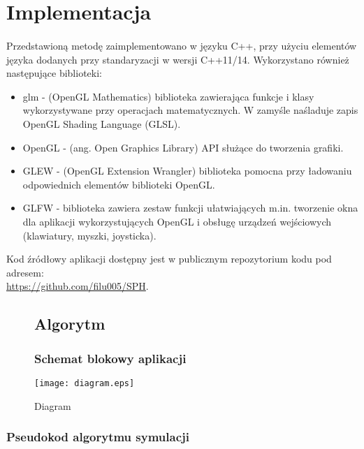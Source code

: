\newpage

\section{Implementacja}

\paragraph{}
Przedstawioną metodę zaimplementowano w języku C++, przy użyciu elementów języka dodanych przy standaryzacji w wersji C++11/14. Wykorzystano również następujące biblioteki:
\begin{itemize}
	\item glm - (OpenGL Mathematics) biblioteka zawierająca funkcje i klasy wykorzystywane przy operacjach matematycznych. W zamyśle naśladuje zapis OpenGL Shading Language (GLSL).
	\item OpenGL - (ang. Open Graphics Library) API służące do tworzenia grafiki.
	\item GLEW - (OpenGL Extension Wrangler) biblioteka pomocna przy ładowaniu odpowiednich elementów biblioteki OpenGL.
	\item GLFW - biblioteka zawiera zestaw funkcji ułatwiających m.in. tworzenie okna dla aplikacji wykorzystujących OpenGL i obsługę urządzeń wejściowych (klawiatury, myszki, joysticka).
\end{itemize}
Kod źródłowy aplikacji dostępny jest w publicznym repozytorium kodu pod adresem:\\ \href{https://github.com/filu005/SPH}{https://github.com/filu005/SPH}.
\par


\begin{figure}
\subsection{Algorytm}
\subsubsection{Schemat blokowy aplikacji}

\centering
\caption{Diagram}
\texttt{[image: diagram.eps]}%
\label{fig:diagram_main}
\newpage
\end{figure}
\newpage

\subsubsection{Pseudokod algorytmu symulacji}

